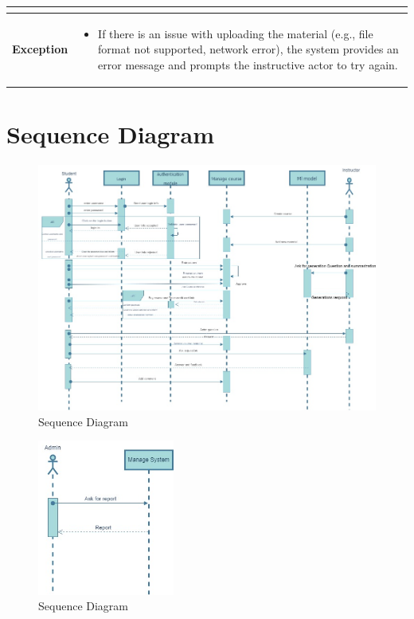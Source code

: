 \begin{table}[h!]
\begin{tabular}{|m{4cm}|m{11cm}|}
\begin{itemize}[noitemsep,topsep=0pt]
        \end{itemize} \\
        \hline
        \textbf{Exception} & 
        \begin{itemize}[noitemsep,topsep=0pt]
            \item If there is an issue with uploading the material (e.g., file format not supported, network error), the system provides an error message and prompts the instructive actor to try again.
        \end{itemize} \\
        \hline
    \end{tabular}
    \egroup
\end{table}

\newpage

\section{Sequence Diagram}
\begin{figure}[h!]
	\centering
	\includegraphics[max height=\textheight,max width=\textwidth]{figures/sequence.jpeg}
	\caption{Sequence Diagram}
\end{figure}

\begin{figure}[h!]
	\centering
	\includegraphics[width=0.40\textwidth]{figures/sequence-admin.jpeg}
	\caption{Sequence Diagram}
\end{figure}

